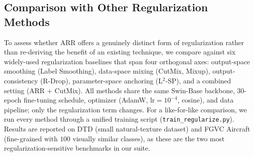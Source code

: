 \documentclass[review,12pt,authoryear]{elsarticle}
\newcommand{\method}{ARR}
\begin{document}
\subsection{Comparison with Other Regularization Methods}
\label{sec:exp:comparison}

To assess whether \method{} offers a genuinely distinct form of regularization rather than re-deriving the benefit of an existing technique, we compare against six widely-used regularization baselines that span four orthogonal axes: output-space smoothing (Label Smoothing), data-space mixing (CutMix, Mixup), output-consistency (R-Drop), parameter-space anchoring (L$^2$-SP), and a combined setting (\method{} $+$ CutMix).
All methods share the same Swin-Base backbone, 30-epoch fine-tuning schedule, optimizer (AdamW, $\text{lr}=10^{-4}$, cosine), and data pipeline; only the regularization term changes.
For a like-for-like comparison, we run every method through a unified training script (\texttt{train\_regularize.py}). Results are reported on DTD (small natural-texture dataset) and FGVC Aircraft (fine-grained with $100$ visually similar classes), as these are the two most regularization-sensitive benchmarks in our suite.
\end{document}

